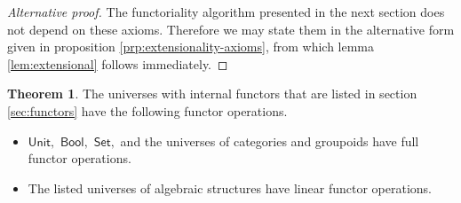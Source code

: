 \documentclass[a4paper]{article}
\theoremstyle{definition}
\newtheorem{theorem}[definition]{Theorem}
\theoremstyle{remark}
\newcommand{\nm}{\mathsf}
\newcommand{\universe}{\nm}
\newcommand{\Unit}{\universe{Unit}}
\newcommand{\Bool}{\universe{Bool}}
\newcommand{\Set}{\universe{Set}}
\begin{document}
\begin{proof}[Alternative proof]
  The functoriality algorithm presented in the next section does not depend on these
  axioms. Therefore we may state them in the alternative form given in proposition
  \ref{prp:extensionality-axioms}, from which lemma \ref{lem:extensional} follows
  immediately.
\end{proof}

\begin{theorem}
  \label{thm:funop}
  The universes with internal functors that are listed in section \ref{sec:functors} have the
  following functor operations.
  \begin{itemize}
    \item $\Unit,$ $\Bool,$ $\Set,$ and the universes of categories and groupoids have
    full functor operations.
    \item The listed universes of algebraic structures have linear functor operations.
  \end{itemize}
\end{theorem}
\end{document}
